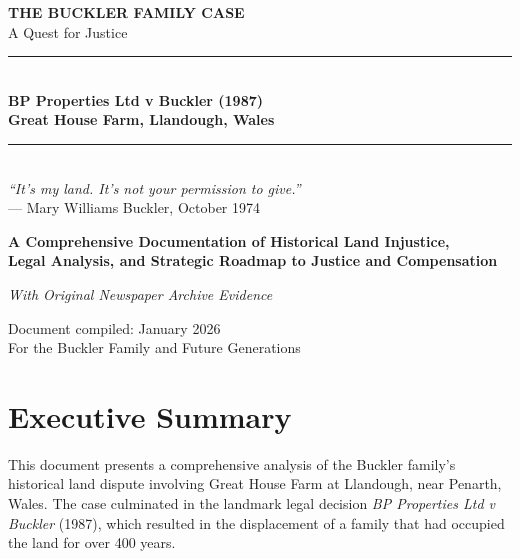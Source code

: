 \documentclass[11pt,a4paper]{article}
\begin{document}
\begin{titlepage}
\centering
\vspace*{2cm}

{\Huge\bfseries\color{darkblue} THE BUCKLER FAMILY CASE}\\[0.5cm]
{\LARGE\color{burgundy} A Quest for Justice}\\[1cm]

\rule{\textwidth}{1.5pt}\\[0.5cm]
{\Large\bfseries BP Properties Ltd v Buckler (1987)\\
Great House Farm, Llandough, Wales}\\[0.5cm]
\rule{\textwidth}{1.5pt}\\[2cm]

{\large\itshape ``It's my land. It's not your permission to give.''}\\[0.3cm]
{\normalsize --- Mary Williams Buckler, October 1974}\\[2cm]

\begin{tcolorbox}[colback=lightgray,colframe=darkblue,width=0.9\textwidth]
\centering
\textbf{A Comprehensive Documentation of Historical Land Injustice,\\Legal Analysis, and Strategic Roadmap to Justice and Compensation}

\vspace{0.5cm}
\textit{With Original Newspaper Archive Evidence}
\end{tcolorbox}

\vfill

{\large Document compiled: January 2026}\\[0.5cm]
{\normalsize For the Buckler Family and Future Generations}

\end{titlepage}

\tableofcontents
\newpage

\section{Executive Summary}

This document presents a comprehensive analysis of the Buckler family's historical land dispute involving Great House Farm at Llandough, near Penarth, Wales. The case culminated in the landmark legal decision \textit{BP Properties Ltd v Buckler} (1987), which resulted in the displacement of a family that had occupied the land for over 400 years.
\end{document}
